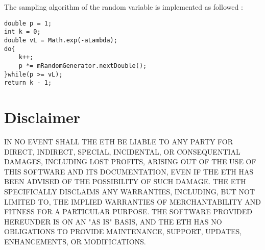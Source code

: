 \documentclass{scrartcl}
\begin{document}
The sampling algorithm of the random variable is implemented as followed \cite{Knuth}:
\begin{lstlisting}
double p = 1;
int k = 0;
double vL = Math.exp(-aLambda);
do{
	k++;
	p *= mRandomGenerator.nextDouble();
}while(p >= vL);
return k - 1;
\end{lstlisting}

\section{Disclaimer}
IN NO EVENT SHALL THE ETH BE LIABLE TO ANY PARTY FOR DIRECT, INDIRECT, SPECIAL, INCIDENTAL, OR CONSEQUENTIAL DAMAGES, INCLUDING LOST PROFITS, ARISING OUT OF THE USE OF THIS SOFTWARE AND ITS DOCUMENTATION, EVEN IF THE ETH HAS BEEN ADVISED OF THE POSSIBILITY OF SUCH DAMAGE. THE ETH SPECIFICALLY DISCLAIMS ANY WARRANTIES, INCLUDING, BUT NOT LIMITED TO, THE IMPLIED WARRANTIES OF MERCHANTABILITY AND FITNESS FOR A PARTICULAR PURPOSE. THE SOFTWARE PROVIDED HEREUNDER IS ON AN "AS IS" BASIS, AND THE ETH HAS NO OBLIGATIONS TO PROVIDE MAINTENANCE, SUPPORT, UPDATES, ENHANCEMENTS, OR MODIFICATIONS.



\end{document}
